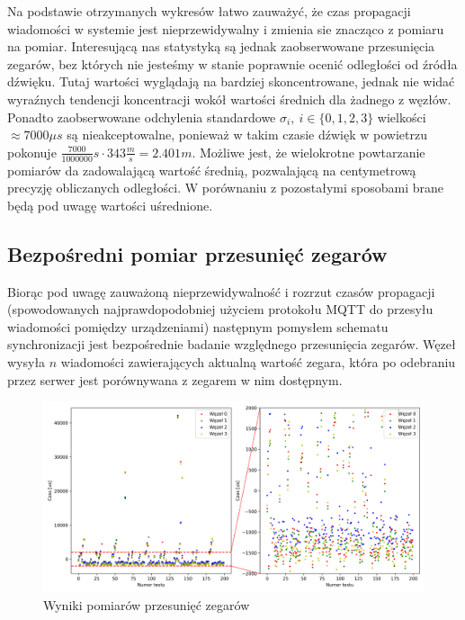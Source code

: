 Na podstawie otrzymanych wykresów łatwo zauważyć, że czas propagacji wiadomości w systemie jest nieprzewidywalny i zmienia sie znacząco z pomiaru na pomiar. Interesującą nas statystyką są jednak zaobserwowane przesunięcia zegarów, bez których nie jesteśmy w stanie poprawnie ocenić odległości od źródła dźwięku. Tutaj wartości wyglądają na bardziej skoncentrowane, jednak nie widać wyraźnych tendencji koncentracji wokół wartości średnich dla żadnego z węzłów. Ponadto zaobserwowane odchylenia standardowe $\sigma_i,\ i \in \{0,1,2,3\}$ wielkości $\approx 7000 \mu s$ są nieakceptowalne, ponieważ w takim czasie dźwięk w powietrzu pokonuje $\frac{7000}{1000000}s \cdot 343\frac{m}{s} = 2.401m$. Możliwe jest, że wielokrotne powtarzanie pomiarów da zadowalającą wartość średnią, pozwalającą na centymetrową precyzję obliczanych odległości. W porównaniu z pozostałymi sposobami brane będą pod uwagę wartości uśrednione.

\subsection{Bezpośredni pomiar przesunięć zegarów}\label{sec:time_deltas_sync}

Biorąc pod uwagę zauważoną nieprzewidywalność i rozrzut czasów propagacji (spowodowanych najprawdopodobniej użyciem protokołu MQTT do przesyłu wiadomości pomiędzy urządzeniami) następnym pomysłem schematu synchronizacji jest bezpośrednie badanie względnego przesunięcia zegarów. Węzeł wysyła $n$ wiadomości zawierających aktualną wartość zegara, która po odebraniu przez serwer jest porównywana z zegarem w nim dostępnym.

\begin{figure}[H]
    \centering
    \includegraphics[width=\textwidth]{pics/time_deltas/time_deltas.png}
    \caption{Wyniki pomiarów przesunięć zegarów}
    \label{pic:offsets_deltas}
\end{figure}

